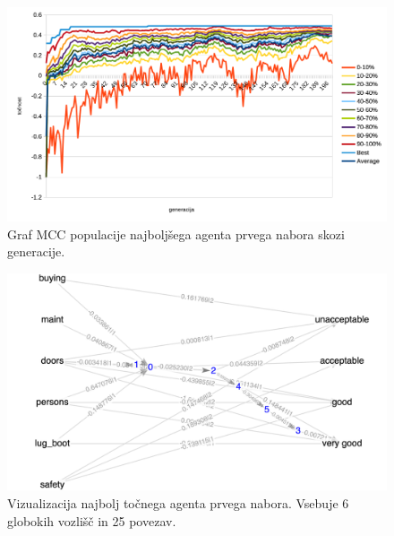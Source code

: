 \begin{figure}[H]
    \begin{center}
        \includegraphics[width=13cm]{car/1/mcc}
    \end{center}
    \caption{Graf MCC populacije najboljšega agenta prvega nabora skozi generacije.}
    \label{fig:car_mcc_1}
\end{figure}

\begin{figure}[H]
    \begin{center}
        \includegraphics[width=13cm]{car/1/acc_g}
    \end{center}
    \caption{Vizualizacija najbolj točnega agenta prvega nabora. Vsebuje 6 globokih vozlišč in 25 povezav.}
    \label{fig:car_acc_1_g}
\end{figure}

